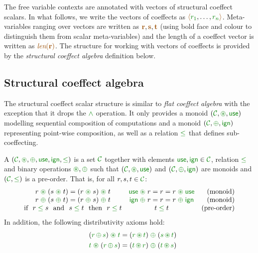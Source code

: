 The free variable contexts are annotated with vectors of structural coeffect scalars. In what follows,
we write the vectors of coeffects as $\alift{\cclrd{r_1}, \ldots, \cclrd{r_n}}$. Meta-variables ranging 
over vectors are written as $\aclrd{\textbf{r}}, \aclrd{\textbf{s}}, \aclrd{\textbf{t}}$ (using bold face 
and colour to distinguish them from scalar meta-variables) and the length of a coeffect vector
is written as $\alen{\aclrd{\textbf{r}}}$. The structure for working with vectors
of coeffects is provided by the \emph{structural coeffect algebra} definition below. 


\subsection{Structural coeffect algebra}

The structural coeffect scalar structure is similar to \emph{flat coeffect algebra} with the 
exception that it drops the $\czip$ operation. It only provides a monoid $(\C, \cseq, \cunit)$
modelling sequential composition of computations and a monoid $(\C, \cpar, \czero)$ representing
point-wise composition, as well as a relation $\cleq$ that defines sub-coeffecting.

\begin{definition}
\label{def:structural-scalar}
A \emph{} $(\C, \cseq, \cpar, \cunit, \czero, \cleq)$ is a set 
$\C$ together with elements $\cunit, \czero \in \C$, relation $\cleq$ and binary operations 
$\cseq, \cpar$ such that $(\C, \cseq, \cunit)$ and $(\C, \cpar, \czero)$ are monoids and
$(\C, \cleq)$ is a pre-order. That is, for all $r,s,t\in \C$:
%
\begin{equation*}
\begin{array}{ccr}
r \;\cseq\; (s \;\cseq\; t) = (r \;\cseq\; s) \;\cseq\; t  &
\cunit \;\cseq\; r = r = r \;\cseq\; \cunit &
\textnormal{(monoid)}   
\\
r \;\cpar\; (s \;\cpar\; t) = (r \;\cpar\; s) \;\cpar\; t &
\czero \;\cpar\; r = r = r \;\cpar\; \czero &
\textnormal{(monoid)}   
\\
\textnormal{if}~~r\; \cleq\; s ~~\textnormal{and}~~s\; \cleq\; t~~\textnormal{then}~~r\; \cleq\; t&
t\; \cleq\; t &
\textnormal{(pre-order)}   
\end{array}
\end{equation*}
%
In addition, the following distributivity axioms hold:
\begin{align*}
\quad (\cclrd{r}\, \cpar\, \cclrd{s}) \;\cseq\; \cclrd{t} & = (\cclrd{r} \,\cseq\, \cclrd{t}) \;\cpar\; (\cclrd{s}\, \cseq\, \cclrd{t}) \\
\quad \cclrd{t} \;\cseq\; (\cclrd{r}\, \cpar\, \cclrd{s}) & = (\cclrd{t} \,\cseq\, \cclrd{r}) \;\cpar\; (\cclrd{t}\, \cseq\, \cclrd{s})
\end{align*}
\end{definition}

